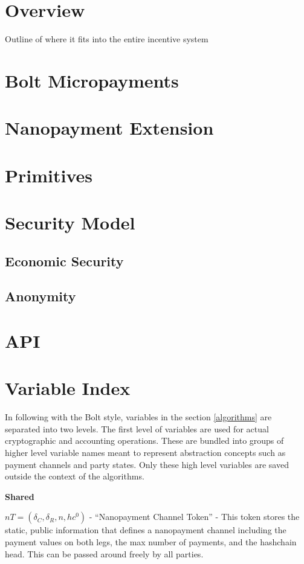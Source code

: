 \documentclass{article}
\begin{document}
\section{Overview}
Outline of where it fits into the entire incentive system
\section{Bolt Micropayments}

\section{Nanopayment Extension}

\section{Primitives}

\section{Security Model}

\subsection{Economic Security}

\subsection{Anonymity}

\section{API}

\section{Variable Index} \label{variable index}

In following with the Bolt style, variables in the section \ref{algorithms} are separated into two levels. The first level of variables are used for actual cryptographic and accounting operations. These are bundled into groups of higher level variable names meant to represent abstraction concepts such as payment channels and party states. Only these high level variables are saved outside the context of the algorithms.

\textbf{Shared}

$nT = (\delta_C, \delta_R, n, hc^0)$ - ``Nanopayment Channel Token'' - This token stores the static, public information that defines a nanopayment channel including the payment values on both legs, the max number of payments, and the hashchain head. This can be passed around freely by all parties.
\end{document}
